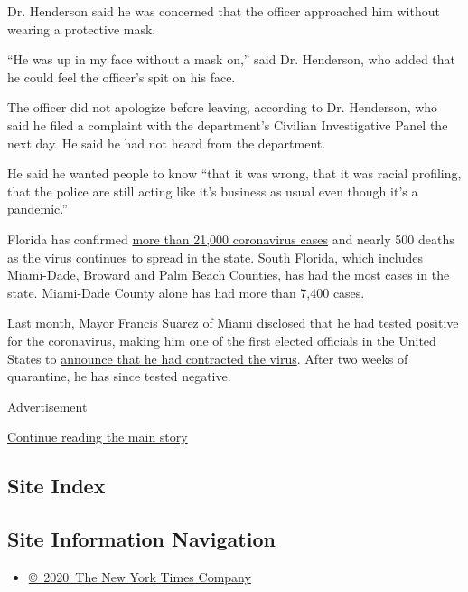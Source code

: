 Dr. Henderson said he was concerned that the officer approached him
without wearing a protective mask.

``He was up in my face without a mask on,'' said Dr. Henderson, who
added that he could feel the officer's spit on his face.

The officer did not apologize before leaving, according to Dr.
Henderson, who said he filed a complaint with the department's Civilian
Investigative Panel the next day. He said he had not heard from the
department.

He said he wanted people to know ``that it was wrong, that it was racial
profiling, that the police are still acting like it's business as usual
even though it's a pandemic.''

Florida has confirmed
\href{https://www.nytimes3xbfgragh.onion/interactive/2020/us/florida-coronavirus-cases.html}{more
than 21,000 coronavirus cases} and nearly 500 deaths as the virus
continues to spread in the state. South Florida, which includes
Miami-Dade, Broward and Palm Beach Counties, has had the most cases in
the state. Miami-Dade County alone has had more than 7,400 cases.

Last month, Mayor Francis Suarez of Miami disclosed that he had tested
positive for the coronavirus, making him one of the first elected
officials in the United States to
\href{https://www.nytimes3xbfgragh.onion/2020/03/13/us/coronavirus-miami-francis-suarez.html}{announce
that he had contracted the virus}. After two weeks of quarantine, he has
since tested negative.

Advertisement

\protect\hyperlink{after-bottom}{Continue reading the main story}

\hypertarget{site-index}{%
\subsection{Site Index}\label{site-index}}

\hypertarget{site-information-navigation}{%
\subsection{Site Information
Navigation}\label{site-information-navigation}}

\begin{itemize}
\tightlist
\item
  \href{https://help.nytimes3xbfgragh.onion/hc/en-us/articles/115014792127-Copyright-notice}{©~2020~The
  New York Times Company}
\end{itemize}


